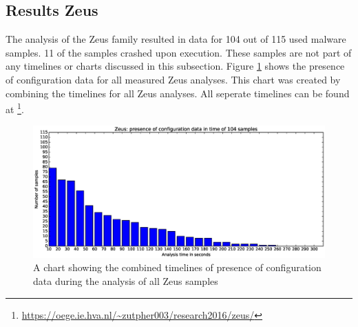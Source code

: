 \documentclass[conference]{IEEEtran}
\begin{document}
\subsection{Results Zeus}
The analysis of the Zeus family resulted in data for 104 out of 115 used malware samples. 11 of the samples crashed upon execution. These samples are not part of any timelines or charts discussed in this subsection. Figure \ref{fig:zeus-bar} shows the presence of configuration data for all measured Zeus analyses. This chart was created by combining the timelines for all Zeus analyses. All seperate timelines can be found at \footnote{\url{https://oege.ie.hva.nl/~zutpher003/research2016/zeus/}}.\\

\begin{figure}[!h]
	\hspace{-3cm}
    \includegraphics[width=13cm,trim=-95mm 0mm 0mm 9mm, clip=true]{images/zeus/Zeus-barchart.eps}
    \caption{A chart showing the combined timelines of presence of configuration data during the analysis of all Zeus samples}
    \label{fig:zeus-bar}
\end{figure}
\end{document}
